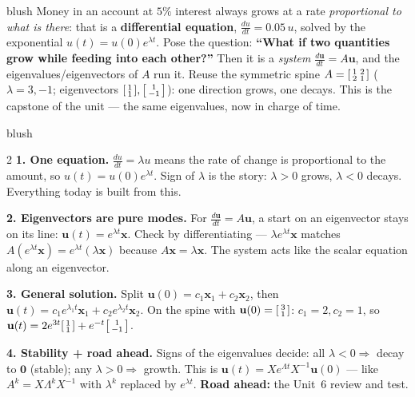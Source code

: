 \documentclass[10pt]{article}
\newcommand{\uu}{\mathbf{u}}
\newcommand{\xx}{\mathbf{x}}
\newcommand{\zero}{\mathbf{0}}
\begin{document}
\begin{skillbox}[Hook]{blush}
    Money in an account at $5\%$ interest always grows at a rate \emph{proportional to what is there}: that is a
    \textbf{differential equation}, $\frac{du}{dt}=0.05\,u$, solved by the exponential $u(t)=u(0)e^{\lambda t}$.
    Pose the question: \textbf{``What if two quantities grow while feeding into each other?''} Then it is a
    \emph{system} $\frac{d\uu}{dt}=A\uu$, and the eigenvalues/eigenvectors of $A$ run it. Reuse the symmetric
    spine $A=\begin{bsmallmatrix}1&2\\2&1\end{bsmallmatrix}$ ($\lambda=3,-1$; eigenvectors
    $\begin{bsmallmatrix}1\\1\end{bsmallmatrix},\begin{bsmallmatrix}1\\-1\end{bsmallmatrix}$): one direction
    grows, one decays. This is the capstone of the unit --- the same eigenvalues, now in charge of time.
\end{skillbox}

\begin{skillbox}[Lesson]{blush}
\begin{multicols}{2}
\textbf{1. One equation.} $\frac{du}{dt}=\lambda u$ means the rate of change is proportional to the amount, so
$u(t)=u(0)e^{\lambda t}$. Sign of $\lambda$ is the story: $\lambda>0$ grows, $\lambda<0$ decays. Everything
today is built from this.

\textbf{2. Eigenvectors are pure modes.} For $\frac{d\uu}{dt}=A\uu$, a start on an eigenvector stays on its
line: $\uu(t)=e^{\lambda t}\xx$. Check by differentiating --- $\lambda e^{\lambda t}\xx$ matches
$A(e^{\lambda t}\xx)=e^{\lambda t}(\lambda\xx)$ because $A\xx=\lambda\xx$. The system acts like the scalar
equation along an eigenvector.

\columnbreak

\textbf{3. General solution.} Split $\uu(0)=c_1\xx_1+c_2\xx_2$, then
$\uu(t)=c_1e^{\lambda_1 t}\xx_1+c_2e^{\lambda_2 t}\xx_2$. On the spine with
$\uu(0)=\begin{bsmallmatrix}3\\1\end{bsmallmatrix}$: $c_1=2,c_2=1$, so
$\uu(t)=2e^{3t}\begin{bsmallmatrix}1\\1\end{bsmallmatrix}+e^{-t}\begin{bsmallmatrix}1\\-1\end{bsmallmatrix}$.

\textbf{4. Stability + road ahead.} Signs of the eigenvalues decide: all $\lambda<0\Rightarrow$ decay to
$\zero$ (stable); any $\lambda>0\Rightarrow$ growth. This is $\uu(t)=Xe^{\Lambda t}X^{-1}\uu(0)$ --- like
$A^k=X\Lambda^k X^{-1}$ with $\lambda^k$ replaced by $e^{\lambda t}$. \textbf{Road ahead:} the Unit~6 review
and test.
\end{multicols}
\end{skillbox}
\end{document}
